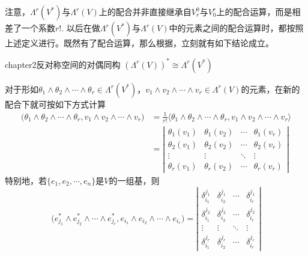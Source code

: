 注意，$\Lambda^{r}(V^{\ast})$与$\Lambda^{r}(V)$上的配合并非直接继承自$V^{0}_{r}$与$V^{r}_{0}$上的配合运算，而是相差了一个系数$r!$. 以后在做$\Lambda^{r}(V^{\ast})$与$\Lambda^{r}(V)$中的元素之间的配合运算时，都按照上述定义进行。既然有了配合运算，那么根据，立刻就有如下结论成立。
\begin{mythm}{}{chapter2反对称空间的对偶同构}
$\left( \Lambda^{r}(V) \right)^{\ast}\cong \Lambda^{r}(V^{\ast})$
\end{mythm}

对于形如$\theta_{1}\wedge \theta_{2}\wedge\cdots\wedge \theta_{r}\in \Lambda^{r}(V^{\ast})$，$v_{1}\wedge v_{2}\wedge \cdots\wedge v_{r}\in \Lambda^{r}(V)$的元素，在新的配合下就可按如下方式计算
\begin{equation}
\begin{split}
	\bigl(\theta_{1}\wedge \theta_{2}\wedge\cdots\wedge \theta_{r} ,v_{1}\wedge v_{2}\wedge \cdots\wedge v_{r} \bigr)&=\frac{1}{r!}\bigl\langle\theta_{1}\wedge \theta_{2}\wedge\cdots\wedge \theta_{r} ,v_{1}\wedge v_{2}\wedge \cdots\wedge v_{r} \bigr\rangle\\
&=\left|\begin{array}{cccc}\theta_{1}(v_{1}) & \theta_{1}(v_{2}) & \cdots & \theta_{1}(v_{r}) \\ \theta_{2}(v_{1}) & \theta_{2}(v_{2}) & \cdots & \theta_{2}(v_{r}) \\ \vdots & \vdots & \ddots& \vdots \\ \theta_{r}(v_{1}) & \theta_{r}(v_{2}) & \cdots & \theta_{r}(v_{r})\end{array}\right|
\end{split}
\end{equation}
特别地，若$\{e_{1} ,e_{2},\cdots,e_{n}\}$是$V$的一组基，则
\begin{equation}
\bigl(e^{\ast}_{j_{1}}\wedge e^{\ast}_{j_{2}}\wedge \cdots\wedge e^{\ast}_{j_{r}} ,e_{i_{1}}\wedge e_{i_{2}}\wedge \cdots\wedge e_{i_{r}}\bigr)=\left|\begin{array}{cccc}\delta^{j_{1}}_{i_{1}} & \delta^{j_{1}}_{i_{2}} & \cdots & \delta^{j_{1}}_{i_{r}} \\ \delta^{j_{2}}_{i_{1}} & \delta^{j_{2}}_{i_{2}} & \cdots & \delta^{j_{2}}_{i_{r}} \\ \vdots & \vdots & \ddots& \vdots \\ \delta^{j_{r}}_{i_{1}} & \delta^{j_{r}}_{i_{2}} & \cdots & \delta^{j_{r}}_{i_{r}}\end{array}\right|
	\label{反对称空间的对偶基}
\end{equation}

